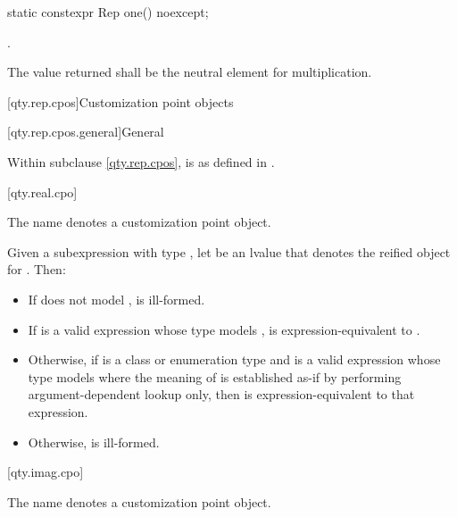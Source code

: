 \begin{itemdecl}
static constexpr Rep one() noexcept;
\end{itemdecl}

\begin{itemdescr}
\pnum
\returns
{}.

\pnum
\remarks
The value returned shall be the neutral element for multiplication.
\end{itemdescr}

[qty.rep.cpos]{Customization point objects}

[qty.rep.cpos.general]{General}

\pnum
Within subclause \ref{qty.rep.cpos},
 is as defined in .

[qty.real.cpo]{}

\pnum
The name  denotes a customization point object.

\pnum
Given a subexpression  with type ,
let  be an lvalue that denotes the reified object for .
Then:
\begin{itemize}
\item
If  does not model ,
 is ill-formed.
\item
If  is a valid expression whose type models ,
 is expression-equivalent to .
\item
Otherwise, if  is a class or enumeration type and
 is a valid expression whose type models 
where the meaning of  is established as-if by performing argument-dependent lookup only,
then  is expression-equivalent to that expression.
\item
Otherwise,  is ill-formed.
\end{itemize}

[qty.imag.cpo]{}

\pnum
The name  denotes a customization point object.

